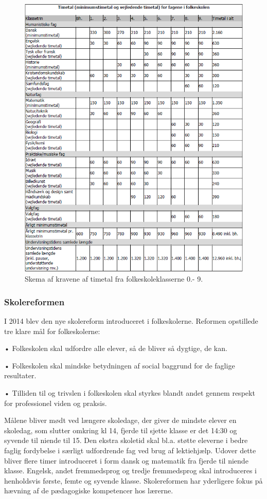 \begin{figure}[!ht]
  \centering
  \includegraphics[scale = 1]{partials/graphics/overallskemaovertimetal.png}
  \caption{Skema af kravene af timetal fra folkeskoleklasserne 0.- 9.}
  \label{fig:Timetal}
\end{figure}
 	
\subsubsection{Skolereformen}
I 2014 blev den nye skolereform introduceret i folkeskolerne. Reformen opstillede tre klare mål for folkeskolerne:

•	Folkeskolen skal udfordre alle elever, så de bliver så dygtige, de kan.

•	Folkeskolen skal mindske betydningen af social baggrund for de faglige resultater.

•	Tilliden til og trivslen i folkeskolen skal styrkes blandt andet gennem respekt for professionel viden og praksis.

Målene bliver mødt ved længere skoledage, der giver de mindste elever en skoledag, som slutter omkring kl 14, fjerde til sjette klasse er det 14:30 og syvende til niende til 15. Den ekstra skoletid skal bl.a. støtte eleverne i bedre faglig fordybelse i særligt udfordrende fag ved brug af lektiehjælp. Udover dette bliver flere timer introduceret i form dansk og matematik fra fjerde til niende klasse. Engelsk, andet fremmedsprog og tredje fremmedsprog skal introduceres i henholdsvis første, femte og syvende klasse.
Skolereformen har yderligere fokus på hævning af de pædagogiske kompetencer hos lærerne.
